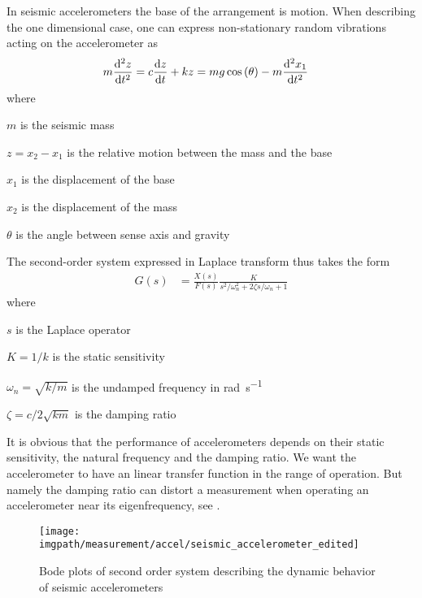 In seismic accelerometers the base of the arrangement is motion. When describing the one dimensional case, one can express non-stationary random vibrations acting on the accelerometer as
\begin{align}
    m\dv[2]{z}{t} &= c\dv{z}{t} + kz = mg\cos\pqty{\theta}-m\dv[2]{x_1}{t}
\end{align}
where
\begin{description}[topsep=0ex, noitemsep]
    \item $m$ is the seismic mass
    \item $z=x_2-x_1$ is the relative motion between the mass and the base
    \item $x_1$ is the displacement of the base
    \item $x_2$ is the displacement of the mass
    \item $\theta$ is the angle between sense axis and gravity
\end{description}
The second-order system expressed in Laplace transform thus takes the form
\begin{align}
    G(s) &= \frac{X(s)}{F(s)} \frac{K}{s^2/\omega_n^2 + 2\zeta s/\omega_n + 1}
\end{align}
where
\begin{description}[topsep=0ex, noitemsep]
    \item $s$ is the Laplace operator
    \item $K=1/k$ is the static sensitivity
    \item $\omega_n=\sqrt{k/m}$ is the undamped frequency in \si{\radian\per\second}
    \item $\zeta=c/2\sqrt{km}$ is the damping ratio
\end{description}
It is obvious that the performance of accelerometers depends on their static sensitivity, the natural frequency and the damping ratio. We want the accelerometer to have an linear transfer function in the range of operation. But namely the damping ratio can distort a measurement when operating an accelerometer near its eigenfrequency, see .


\begin{figure}[!htb]
    \texttt{[image: \\imgpath/measurement/accel/seismic\_accelerometer\_edited]}
    \caption[Second-Order System Bode plots]{Bode plots of second order system describing the dynamic behavior of seismic accelerometers}
    \label{fig:seismic_accelerometer_edited}
\end{figure}

